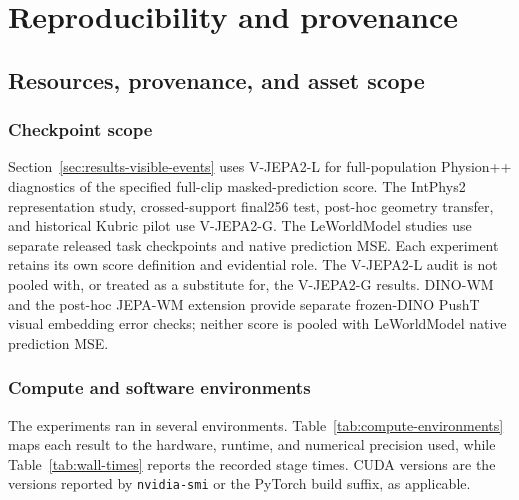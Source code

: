 \section{Reproducibility and provenance}
\label{app:static-calibration}

\subsection{Resources, provenance, and asset scope}
\label{app:resources-provenance}

\subsubsection{Checkpoint scope}
\label{app:checkpoint-scope}
Section~\ref{sec:results-visible-events} uses V-JEPA2-L for full-population Physion++ diagnostics of the specified full-clip masked-prediction score. The IntPhys2 representation study, crossed-support final256 test, post-hoc geometry transfer, and historical Kubric pilot use V-JEPA2-G. The LeWorldModel studies use separate released task checkpoints and native prediction MSE. Each experiment retains its own score definition and evidential role. The V-JEPA2-L audit is not pooled with, or treated as a substitute for, the V-JEPA2-G results. {\color{black}DINO-WM and the post-hoc JEPA-WM extension provide separate frozen-DINO PushT visual embedding error checks; neither score is pooled with LeWorldModel native prediction MSE.}

\subsubsection{Compute and software environments}
\label{app:compute-environments}
The experiments ran in several environments. Table~\ref{tab:compute-environments} maps each result to the hardware, runtime, and numerical precision used, while Table~\ref{tab:wall-times} reports the recorded stage times. CUDA versions are the versions reported by \texttt{nvidia-smi} or the PyTorch build suffix, as applicable.

